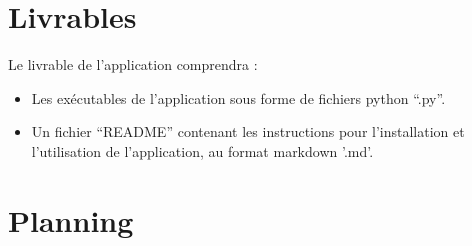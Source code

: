 \documentclass[12pt]{article}
\begin{document}
    \section{Livrables}

    Le livrable de l'application comprendra :

    \begin{itemize}
        \item Les exécutables de l'application sous forme de fichiers python
            ``.py''.
        \item Un fichier ``README'' contenant les instructions pour
            l'installation et l'utilisation de l'application, au format
            markdown '.md'.
    \end{itemize}

    \section{Planning}
\end{document}
